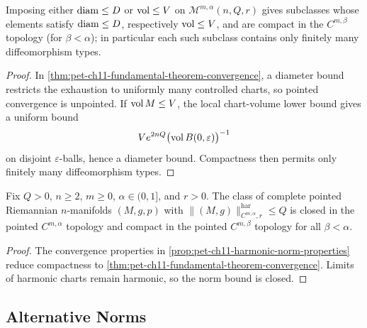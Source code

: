 \begin{corollary}
  \label{cor:pet-ch11-fundamental-thm-diam-vol-bounded}
  Imposing either $\operatorname{diam}\le D$ or $\operatorname{vol}\le V$ on
  $\mathcal{M}^{m,\alpha}(n,Q,r)$ gives subclasses whose elements satisfy
  $\operatorname{diam}\le D$, respectively $\operatorname{vol}\le V$, and are compact in the
  $C^{m,\beta}$ topology (for $\beta<\alpha$); in particular each such
  subclass contains only finitely many diffeomorphism types.
\end{corollary}
\begin{proof}
  \sketch
  In \cref{thm:pet-ch11-fundamental-theorem-convergence}, a diameter bound restricts the exhaustion to uniformly many controlled charts, so pointed convergence is unpointed. If \(\operatorname{vol} M\le V\), the local chart-volume lower bound gives a uniform bound
  \[
    V e^{2nQ}\bigl(\operatorname{vol} B(0,\varepsilon)\bigr)^{-1}
  \]
  on disjoint \(\varepsilon\)-balls, hence a diameter bound. Compactness then permits only finitely many diffeomorphism types.
\end{proof}


\begin{corollary}
  \label{cor:pet-ch11-harmonic-norm-class-compact}
  Fix $Q>0$, $n\ge2$, $m\ge0$, $\alpha\in(0,1]$, and $r>0$. The class of complete
  pointed Riemannian $n$-manifolds $(M,g,p)$ with
  $\|(M,g)\|^{\mathrm{har}}_{C^{m,\alpha},r}\le Q$ is closed in the pointed
  $C^{m,\alpha}$ topology and compact in the pointed $C^{m,\beta}$ topology
  for all $\beta<\alpha$.
\end{corollary}
\begin{proof}
  \sketch
  The convergence properties in \cref{prop:pet-ch11-harmonic-norm-properties} reduce compactness to \cref{thm:pet-ch11-fundamental-theorem-convergence}. Limits of harmonic charts remain harmonic, so the norm bound is closed.
\end{proof}


\subsection{Alternative Norms}


